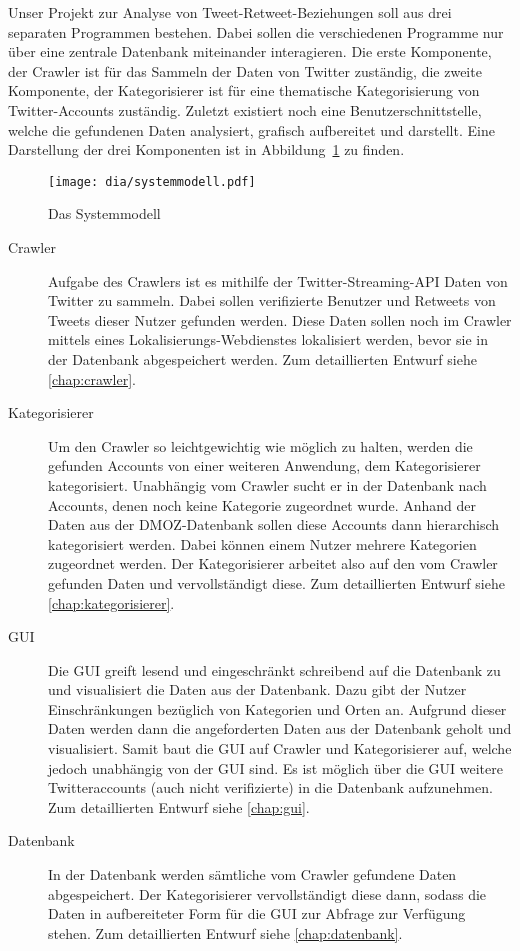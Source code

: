 Unser Projekt zur Analyse von Tweet-Retweet-Beziehungen soll aus drei separaten Programmen bestehen. Dabei sollen die verschiedenen Programme nur über eine zentrale Datenbank miteinander interagieren. Die erste Komponente, der Crawler ist für das Sammeln der Daten von Twitter zuständig, die zweite Komponente, der Kategorisierer ist für eine thematische Kategorisierung von Twitter-Accounts zuständig. Zuletzt existiert noch eine Benutzerschnittstelle, welche die gefundenen Daten analysiert, grafisch aufbereitet und darstellt. Eine Darstellung der drei Komponenten ist in Abbildung~\ref{c:systemmodell} zu finden.

\begin{figure}[h]
	\centering
	\texttt{[image: dia/systemmodell.pdf]}
	\caption{Das Systemmodell}
	\label{c:systemmodell}
\end{figure}

\begin{description}
	\item[Crawler] Aufgabe des Crawlers ist es mithilfe der Twitter-Streaming-API Daten von Twitter zu sammeln. Dabei sollen verifizierte Benutzer und Retweets von Tweets dieser Nutzer gefunden werden. Diese Daten sollen noch im Crawler mittels eines Lokalisierungs-Webdienstes lokalisiert werden, bevor sie in der Datenbank abgespeichert werden. Zum detaillierten Entwurf siehe \cref{chap:crawler}.
	\item[Kategorisierer] Um den Crawler so leichtgewichtig wie möglich zu halten, werden die gefunden Accounts von einer weiteren Anwendung, dem Kategorisierer kategorisiert. Unabhängig vom Crawler sucht er in der Datenbank nach Accounts, denen noch keine Kategorie zugeordnet wurde. Anhand der Daten aus der DMOZ-Datenbank sollen diese Accounts dann hierarchisch kategorisiert werden. Dabei können einem Nutzer mehrere Kategorien zugeordnet werden. Der Kategorisierer arbeitet also auf den vom Crawler gefunden Daten und vervollständigt diese. Zum detaillierten Entwurf siehe \cref{chap:kategorisierer}.
	\item[GUI] Die GUI greift lesend und eingeschränkt schreibend auf die Datenbank zu und visualisiert die Daten aus der Datenbank. Dazu gibt der Nutzer Einschränkungen bezüglich von Kategorien und Orten an. Aufgrund dieser Daten werden dann die angeforderten Daten aus der Datenbank geholt und visualisiert. Samit baut die GUI auf Crawler und Kategorisierer auf, welche jedoch unabhängig von der GUI sind. Es ist möglich über die GUI weitere Twitteraccounts (auch nicht verifizierte) in die Datenbank aufzunehmen. Zum detaillierten Entwurf siehe \cref{chap:gui}.
	\item[Datenbank] In der Datenbank werden sämtliche vom Crawler gefundene Daten abgespeichert. Der Kategorisierer vervollständigt diese dann, sodass die Daten in aufbereiteter Form für die GUI zur Abfrage zur Verfügung stehen. Zum detaillierten Entwurf siehe \cref{chap:datenbank}.
\end{description}